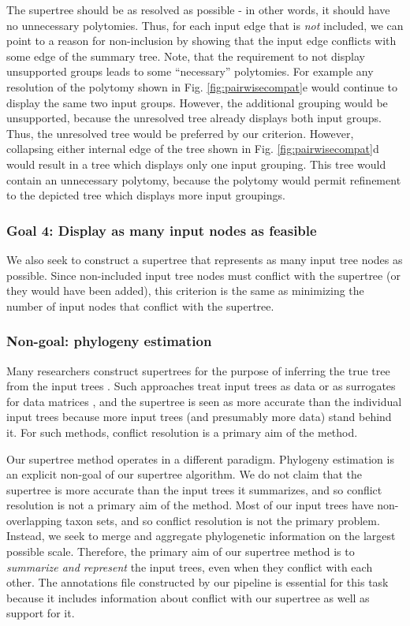\documentclass[fleqn,12pt,lineno,english]{wlpeerj}
\begin{document}
The supertree should be as resolved as possible - in other words,
it should have no unnecessary polytomies. Thus, for each input edge
that is \emph{not} included, we can point to a reason for non-inclusion
by showing that the input edge conflicts with some edge of the summary
tree. Note, that the requirement to not display unsupported groups
leads to some ``necessary'' polytomies. For example any resolution
of the polytomy shown in Fig. \ref{fig:pairwisecompat}e would
continue to display the same two input groups. However, the additional
grouping would be unsupported, because the unresolved tree already
displays both input groups. Thus, the 
unresolved tree would be preferred by our criterion.
However, collapsing either internal edge of the tree shown in Fig.
\ref{fig:pairwisecompat}d would result in a tree which displays
only one input grouping. This tree would contain an unnecessary polytomy,
because the polytomy would permit refinement to the depicted tree
which displays more input groupings.

\subsubsection{Goal 4: Display as many input nodes as feasible}

We also seek to construct a supertree that represents as many input
tree nodes as possible. Since non-included input tree nodes must conflict
with the supertree (or they would have been added), this criterion
is the same as minimizing the number of input nodes that conflict
with the supertree.

\subsubsection{Non-goal: phylogeny estimation}
Many researchers construct supertrees for the purpose of inferring the true tree from the input trees \citep{BinindaEmonds2007b,Davis2014}.  Such approaches treat input trees as data or as surrogates for data matrices \citep{gatesy2004critique}, and the supertree is seen as more accurate than the individual input trees because more input trees (and presumably more data) stand behind it.  For such methods, conflict resolution is a primary aim of the method.

Our supertree method operates in a different paradigm.  Phylogeny estimation is an explicit non-goal of our supertree algorithm.  We do not claim that the supertree is more accurate than the input trees it summarizes, and so conflict resolution is not a primary aim of the method. Most of our input trees have non-overlapping taxon sets, and so conflict resolution is not the primary problem.  Instead, we seek to merge and aggregate phylogenetic information on the largest possible scale.  Therefore, the primary aim of our supertree method is to \emph{summarize and represent} the input trees, even when they conflict with each other.  The annotations file constructed by our pipeline is essential for this task because it includes information about conflict with our supertree as well as support for it.
\end{document}
